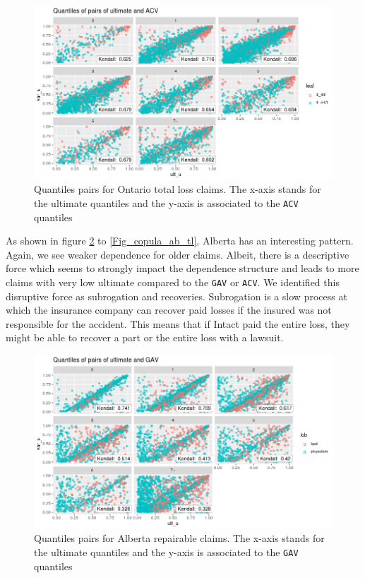 	\begin{figure}[H]
		\begin{center}
			\includegraphics[scale=0.4]{Graphiques/on_tl} 
			\renewcommand{\figurename}{Figure}
			\caption[Ontario total loss claims relationship]{Quantiles pairs for Ontario total loss claims. The x-axis stands for the ultimate quantiles and the y-axis is associated to the \texttt{ACV} quantiles}\label{Fig_copula_on_tl}
		\end{center}
	\end{figure}
	
	As shown in figure \ref{Fig_copula_ab_rep} to \ref{Fig_copula_ab_tl}, Alberta has an interesting pattern. Again, we see weaker dependence for older claims. Albeit, there is a descriptive force which seems to strongly impact the dependence structure and leads to more claims with very low ultimate compared to the \texttt{GAV} or \texttt{ACV}. We identified this disruptive force as subrogation and recoveries. Subrogation is a slow process at which the insurance company can recover paid losses if the insured was not responsible for the accident. This means that if Intact paid the entire loss, they might be able to recover a part or the entire loss with a lawsuit. 
	
	\begin{figure}[H]
		\begin{center}
			\includegraphics[scale=0.4]{Graphiques/ab_rep} 
			\renewcommand{\figurename}{Figure}
			\caption[Alberta repairable claims relationship]{Quantiles pairs for Alberta repairable claims. The x-axis stands for the ultimate quantiles and the y-axis is associated to the \texttt{GAV} quantiles}\label{Fig_copula_ab_rep}
		\end{center}
	\end{figure}
	
